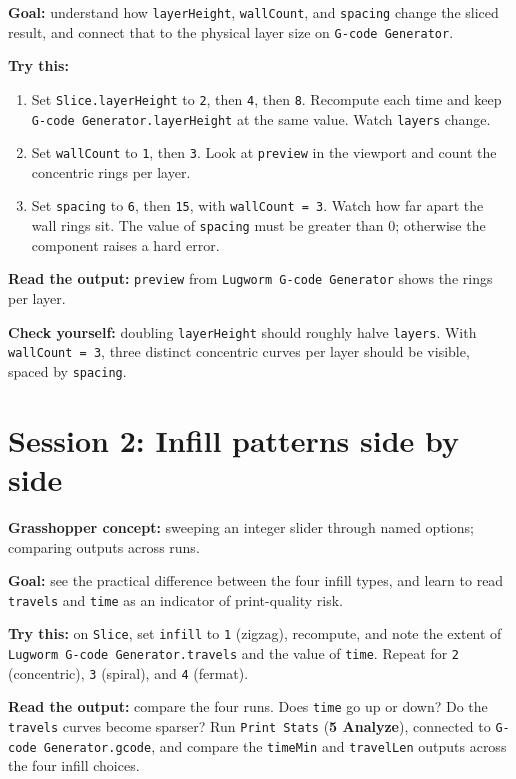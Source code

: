 \documentclass[11pt]{article}
\newcommand{\param}[1]{\texttt{#1}}
\newcommand{\exlabel}[1]{\par\vspace{0.3em}\noindent\textbf{#1:}\enspace}
\begin{document}
\exlabel{Goal} understand how \param{layerHeight}, \param{wallCount},
and \param{spacing} change the sliced result, and connect that to the
physical layer size on \param{G-code Generator}.

\exlabel{Try this}
\begin{enumerate}
  \item Set \param{Slice.layerHeight} to \param{2}, then \param{4}, then \param{8}. Recompute each time and keep \param{G-code Generator.layerHeight} at the same value. Watch \param{layers} change.
  \item Set \param{wallCount} to \param{1}, then \param{3}. Look at \param{preview} in the viewport and count the concentric rings per layer.
  \item Set \param{spacing} to \param{6}, then \param{15}, with \param{wallCount = 3}. Watch how far apart the wall rings sit. The value of \param{spacing} must be greater than 0; otherwise the component raises a hard error.
\end{enumerate}

\exlabel{Read the output} \param{preview} from \param{Lugworm G-code
Generator} shows the rings per layer.

\exlabel{Check yourself} doubling \param{layerHeight} should roughly
halve \param{layers}. With \param{wallCount = 3}, three distinct
concentric curves per layer should be visible, spaced by
\param{spacing}.

\section{Session 2: Infill patterns side by side}

\exlabel{Grasshopper concept} sweeping an integer slider through named
options; comparing outputs across runs.

\exlabel{Goal} see the practical difference between the four infill
types, and learn to read \param{travels} and \param{time} as an
indicator of print-quality risk.

\exlabel{Try this} on \param{Slice}, set \param{infill} to
\param{1} (zigzag), recompute, and note the extent of \param{Lugworm
G-code Generator.travels} and the value of \param{time}. Repeat for
\param{2} (concentric), \param{3} (spiral), and \param{4} (fermat).

\exlabel{Read the output} compare the four runs. Does \param{time} go
up or down? Do the \param{travels} curves become sparser? Run
\param{Print Stats} (\textbf{5 Analyze}), connected to
\param{G-code Generator.gcode}, and compare the \param{timeMin}
and \param{travelLen} outputs across the four infill choices.
\end{document}
